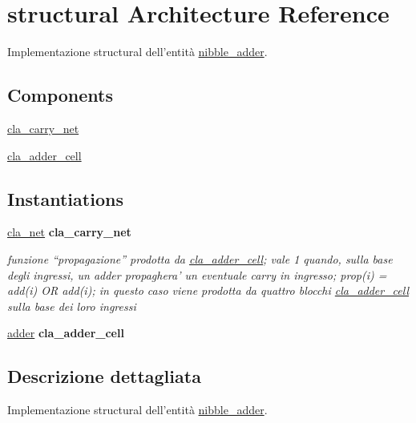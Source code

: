 \hypertarget{classnibble__adder_1_1structural}{\section{structural Architecture Reference}
\label{classnibble__adder_1_1structural}
}


Implementazione structural dell'entità \hyperlink{classnibble__adder}{nibble\+\_\+adder}.  


\subsection*{Components}
 \begin{DoxyCompactItemize}
\item 
\hyperlink{group___nibble_adder_ga12bdc5892f526938e1447d663d152df8}{cla\+\_\+carry\+\_\+net}  {\bfseries }  
\item 
\hyperlink{group___nibble_adder_ga4f13eb52457f650b1d2cd352d9cacca9}{cla\+\_\+adder\+\_\+cell}  {\bfseries }  
\end{DoxyCompactItemize}
\subsection*{Instantiations}
 \begin{DoxyCompactItemize}
\item 
\hyperlink{classnibble__adder_1_1structural_abbf8fdf15c2d70392ab929c8ebe57439}{cla\+\_\+net}  {\bfseries cla\+\_\+carry\+\_\+net}   
\begin{DoxyCompactList}\small\item\em funzione “propagazione” prodotta da \hyperlink{classcla__adder__cell}{cla\+\_\+adder\+\_\+cell}; vale 1 quando, sulla base degli ingressi, un adder propaghera' un eventuale carry in ingresso; prop(i) = add(i) O\+R add(i); in questo caso viene prodotta da quattro blocchi \hyperlink{classcla__adder__cell}{cla\+\_\+adder\+\_\+cell} sulla base dei loro ingressi \end{DoxyCompactList}\item 
\hyperlink{classnibble__adder_1_1structural_a9d7a8a381439c61aea549e7a47ec7a6f}{adder}  {\bfseries cla\+\_\+adder\+\_\+cell}   
\end{DoxyCompactItemize}


\subsection{Descrizione dettagliata}
Implementazione structural dell'entità \hyperlink{classnibble__adder}{nibble\+\_\+adder}. 

